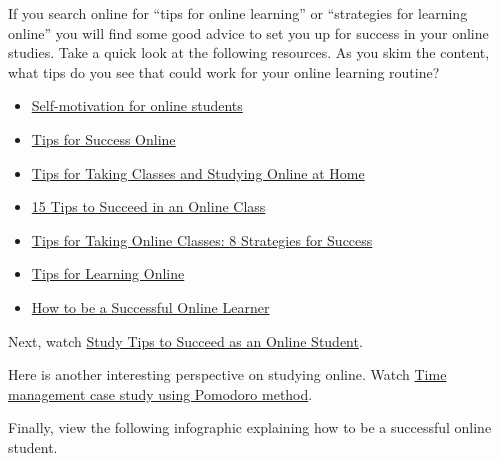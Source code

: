\documentclass[
]{book}
\providecommand{\tightlist}{%
  \setlength{\itemsep}{0pt}\setlength{\parskip}{0pt}}
\theoremstyle{definition}
\theoremstyle{definition}
\theoremstyle{definition}
\theoremstyle{definition}
\theoremstyle{remark}
\begin{document}
\begin{reflect}
If you search online for ``tips for online learning'' or ``strategies for learning online'' you will find some good advice to set you up for success in your online studies. Take a quick look at the following resources. As you skim the content, what tips do you see that could work for your online learning routine?

\begin{itemize}
\tightlist
\item
  \href{https://www.purdueglobal.edu/blog/online-learning/online-learning-self-motivation/}{Self-motivation for online students}\\
\item
  \href{https://www.unlv.edu/online/tips}{Tips for Success Online}\\
\item
  \href{https://www.ualberta.ca/current-students/academic-success-centre/resources/working-online.html}{Tips for Taking Classes and Studying Online at Home}\\
\item
  \href{https://online.umn.edu/story/15-tips-succeed-online-class}{15 Tips to Succeed in an Online Class}\\
\item
  \href{https://graduate.northeastern.edu/resources/tips-for-taking-online-classes/}{Tips for Taking Online Classes: 8 Strategies for Success}\\
\item
  \href{https://scpd.stanford.edu/tips-learning-online}{Tips for Learning Online}\\
\item
  \href{https://www.trentu.ca/online/student-support/be-a-successful-online-learner}{How to be a Successful Online Learner}
\end{itemize}

Next, watch \href{https://www.youtube.com/watch?v=-1DRETk-mns}{Study Tips to Succeed as an Online Student}.

Here is another interesting perspective on studying online. Watch \href{https://www.youtube.com/watch?v=z7e7gtU3PHY}{Time management case study using Pomodoro method}.

Finally, view the following infographic explaining how to be a successful online student.


\end{reflect}
\end{document}
